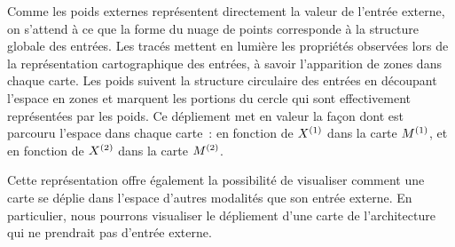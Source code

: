 \documentclass[../main]{subfiles}
\begin{document}
Comme les poids externes représentent directement la valeur de l'entrée externe, on s'attend à ce que la forme du nuage de points corresponde à la structure globale des entrées.
Les tracés mettent en lumière les propriétés observées lors de la représentation cartographique des entrées, à savoir l'apparition de zones dans chaque carte. 
Les poids suivent la structure circulaire des entrées en découpant l'espace en zones et marquent les portions du cercle qui sont effectivement représentées par les poids.
Ce dépliement met en valeur la façon dont est parcouru l'espace dans chaque carte~: en fonction de $X^{({1})}$ dans la carte $M^{({1})}$, et en fonction de $X^{({2})}$ dans la carte $M^{({2})}$.

Cette représentation offre également la possibilité de visualiser comment une carte se déplie dans l'espace d'autres modalités que son entrée externe. En particulier, nous pourrons visualiser le dépliement d'une carte de l'architecture qui ne prendrait pas d'entrée externe.
\end{document}
